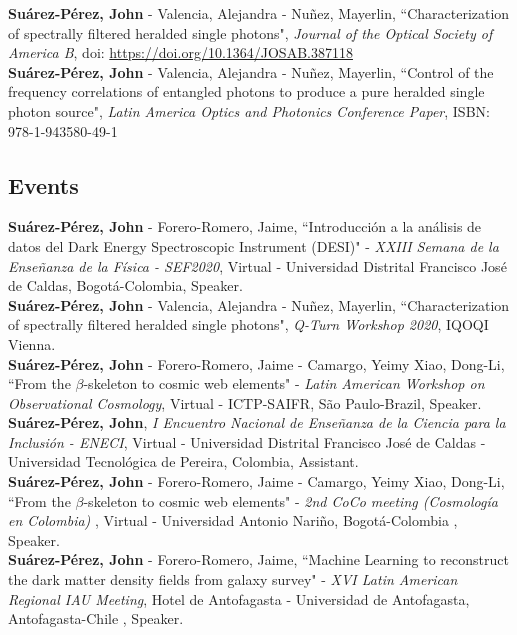 \documentclass[10pt, a4paper]{article}
\newcommand{\years}[1]{\marginnote{\scriptsize #1}}
\begin{document}
\years{2020}\textbf{Suárez-Pérez, John} - Valencia, Alejandra - Nuñez, Mayerlin, “Characterization of spectrally filtered heralded single photons", \emph{Journal of the Optical Society of America B}, doi: \url{https://doi.org/10.1364/JOSAB.387118}
\\

\years{2018}\textbf{Suárez-Pérez, John} - Valencia, Alejandra - Nuñez, Mayerlin, “Control of the frequency correlations of entangled photons to produce a pure heralded single photon source", \emph{Latin America Optics and Photonics Conference Paper}, ISBN: 978-1-943580-49-1 \\

\subsection*{Events}
\noindent
\years{2020}\textbf{Suárez-Pérez, John} - Forero-Romero, Jaime, “Introducción a la análisis de datos del Dark Energy Spectroscopic Instrument (DESI)" - \emph{XXIII Semana de la Enseñanza de la Física - SEF2020}, Virtual - Universidad Distrital Francisco José de Caldas, Bogotá-Colombia, Speaker.\\

\years{2020}\textbf{Suárez-Pérez, John} - Valencia, Alejandra - Nuñez, Mayerlin, “Characterization of spectrally filtered heralded single photons", \emph{Q-Turn Workshop 2020}, IQOQI Vienna.\\

\years{2020}\textbf{Suárez-Pérez, John} - Forero-Romero, Jaime - Camargo, Yeimy  Xiao, Dong-Li, “From the $\beta$-skeleton to cosmic web elements" - \emph{Latin American Workshop on Observational Cosmology}, Virtual - ICTP-SAIFR, São Paulo-Brazil, Speaker.\\

\years{2020}\textbf{Suárez-Pérez, John}, \emph{I Encuentro Nacional de Enseñanza de la Ciencia para la Inclusión - ENECI}, Virtual - Universidad Distrital Francisco José de Caldas - Universidad Tecnológica de Pereira, Colombia, Assistant.\\

\years{2020}\textbf{Suárez-Pérez, John} - Forero-Romero, Jaime - Camargo, Yeimy  Xiao, Dong-Li, “From the $\beta$-skeleton to cosmic web elements" - \emph{2nd CoCo meeting (Cosmología en Colombia) }, Virtual - Universidad Antonio Nariño, Bogotá-Colombia , Speaker.\\

\years{2019}\textbf{Suárez-Pérez, John} - Forero-Romero, Jaime, “Machine Learning to reconstruct the dark matter density fields from galaxy survey" - \emph{XVI Latin American Regional IAU Meeting}, Hotel de Antofagasta - Universidad de Antofagasta, Antofagasta-Chile , Speaker.\\
\end{document}
